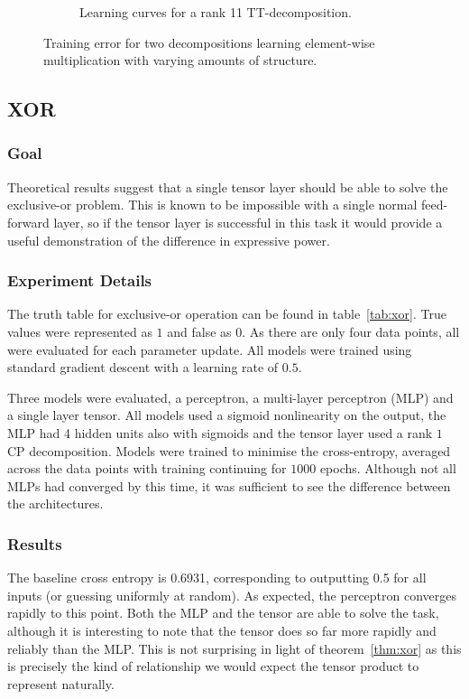 \begin{figure}
\begin{subfigure}[t]{0.45\textwidth}
		\caption{Learning curves for a rank 11 TT-decomposition.}
	\end{subfigure}
	\caption{Training error for two decompositions learning element-wise multiplication with
	 varying amounts of structure.}
	\label{fig:correlate-multiply}
\end{figure}

\subsection{XOR}
\subsubsection{Goal}
Theoretical results suggest that a single tensor layer should be able to solve the exclusive-or problem.
This is known to be impossible with a single normal feed-forward layer, so if the tensor layer is successful
in this task it would provide a useful demonstration of the difference in expressive power.

\subsubsection{Experiment Details}
The truth table for exclusive-or operation can be found in table~\ref{tab:xor}. True values were represented
as \(1\) and false as \(0\). As there are only four data points, all were evaluated for each parameter update.
All models were trained using standard gradient descent with a learning rate of \(0.5\).

Three models were evaluated, a perceptron, a multi-layer perceptron (MLP) and a single layer tensor. All
models used a sigmoid nonlinearity on the output, the MLP had 4 hidden units also with sigmoids and the 
tensor layer used a rank \(1\) CP decomposition. Models
were trained to minimise the cross-entropy, averaged across the data points with training continuing
for \(1000\) epochs. Although not all MLPs had converged by this time, it was sufficient to see the difference
between the architectures. 

\subsubsection{Results}
The baseline cross entropy is 0.6931, corresponding to outputting
0.5 for all inputs (or guessing uniformly at random). As expected, the perceptron converges rapidly to this
point. Both the MLP and the tensor are able to solve the task, although it is interesting to note that the
tensor does so far more rapidly and reliably than the MLP. This is not surprising in light of
theorem~\ref{thm:xor} as this is precisely the kind of relationship we would expect the tensor product to
represent naturally.

